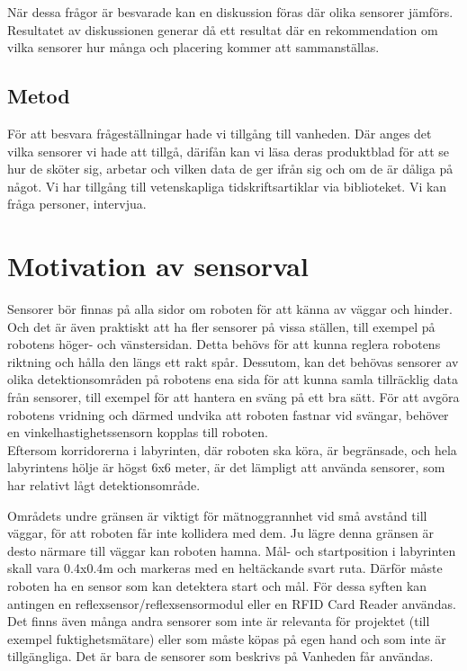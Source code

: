 \documentclass[11pt]{article}
\begin{document}
\begin{flushleft}
\begin{itemize}
\end{itemize}


När dessa frågor är besvarade kan en diskussion föras där olika sensorer jämförs. Resultatet av diskussionen generar då ett resultat där en rekommendation om vilka sensorer hur många och placering kommer att sammanställas.


 
 \subsection{Metod}
För att besvara frågeställningar hade vi tillgång till vanheden. Där anges det vilka sensorer vi hade att tillgå, därifån kan vi läsa deras produktblad för att se hur de sköter sig, arbetar och vilken data de ger ifrån sig och om de är dåliga på något. Vi har tillgång till vetenskapliga tidskriftsartiklar via biblioteket. Vi kan fråga personer, intervjua.  
 
 
\section{Motivation av sensorval}
Sensorer bör finnas på alla sidor om roboten för att känna av väggar och hinder. Och det är även praktiskt att ha fler sensorer på vissa ställen, till exempel på robotens höger- och vänstersidan. Detta behövs för att kunna reglera robotens riktning och hålla den längs ett rakt spår. Dessutom, kan det behövas sensorer av olika detektionsområden på robotens ena sida för att kunna samla tillräcklig data från sensorer, till exempel för att hantera en sväng på ett bra sätt. För att avgöra robotens vridning och därmed undvika att roboten fastnar vid svängar, behöver en vinkelhastighetssensorn kopplas till roboten.
\\[0.1in]
Eftersom korridorerna i labyrinten, där roboten ska köra, är begränsade, och hela labyrintens hölje är högst 6x6 meter, är det lämpligt att använda sensorer, som har relativt lågt detektionsområde. 

\pagebreak

Områdets undre gränsen är viktigt för mätnoggrannhet vid små avstånd till väggar, för att roboten får inte kollidera med dem. Ju lägre denna gränsen är desto närmare till väggar kan roboten hamna. Mål- och startposition i labyrinten skall vara 0.4x0.4m och markeras med en heltäckande svart ruta. Därför måste roboten ha en sensor som kan detektera start och mål. För dessa syften kan antingen en reflexsensor/reflexsensormodul eller en RFID Card Reader användas.
\\[0.1in]
Det finns även många andra sensorer som inte är relevanta för projektet (till exempel fuktighetsmätare) eller som måste köpas på egen hand och som inte är tillgängliga. Det är bara de sensorer som beskrivs på Vanheden får användas.


\end{flushleft}
\end{document}
